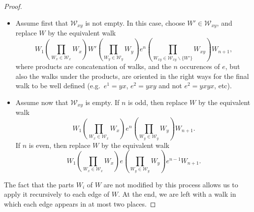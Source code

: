 \documentclass[a4paper,11pt,dvipsnames]{elsarticle}
\begin{document}
\begin{proof}
  \begin{itemize}
      \item Assume first that $\mathcal{W}_{xy}$ is not empty. In this case, choose $W'\in\mathcal{W}_{xy}$, and replace
  $W$ by
  the equivalent walk
  \[
      W_1\left( \prod_{W_x\in\mathcal{W}_x}W_x \right)W'\left( \prod_{W_y\in\mathcal{W}_y}W_y \right) e^n\left(\prod_{W_{xy}\in\mathcal{W}_{xy}\backslash\{W'\}}W_{xy}\right)W_{n+1},
  \]
  where products are concatenation of walks, and the $n$ occurences of $e$, but also the walks under the products, are oriented in the right ways for the final walk to be well defined (e.g.~$e^1=yx$, $e^2=yxy$ and not $e^2=yxyx$, etc).
  
  \item Assume now that $\mathcal{W}_{xy}$ is empty. If $n$ is odd, then replace $W$ by the equivalent walk
  \[
    W_1\left( \prod_{W_x\in\mathcal{W}_x}W_x \right)e^n\left( \prod_{W_y\in\mathcal{W}_y}W_y \right)W_{n+1}.
  \]
  If $n$ is even, then replace $W$ by the equivalent walk
  \[
    W_1\left( \prod_{W_x\in\mathcal{W}_x}W_x \right)e\left( \prod_{W_y\in\mathcal{W}_y}W_y \right)e^{n-1}W_{n+1}.
  \]
  \end{itemize}
  
  The fact that the parts $W_i$ of $W$ are not modified by this process allows us to apply it recursively to each edge of $W$.
  At the end, we are left with a walk in which each edge appears in at most two places.
\end{proof}
\end{document}
